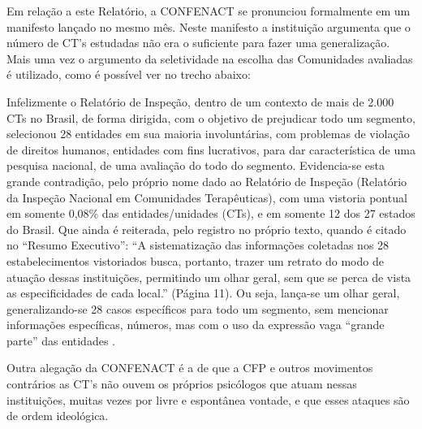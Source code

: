 \documentclass[
	12pt,				%
	oneside,			%
	a4paper,			%
	sumario=tradicional,
	english,			%
	brazil				%
	]{abntex2}
\begin{document}
Em relação a este Relatório, a CONFENACT se pronunciou formalmente em um manifesto lançado no mesmo mês. Neste manifesto a instituição argumenta que o número de CT's estudadas não era o suficiente para fazer uma generalização. Mais uma vez o argumento da seletividade na escolha das Comunidades avaliadas é utilizado, como é possível ver no trecho abaixo:
\begin{quoting}[rightmargin=0cm,leftmargin=4cm]
\begin{singlespace}
{\footnotesize
Infelizmente o Relatório de Inspeção, dentro de um contexto de mais de 2.000 CTs no Brasil, de forma dirigida, com o objetivo de prejudicar todo um segmento, selecionou 28 entidades em sua maioria involuntárias, com problemas de violação de direitos humanos, entidades com fins lucrativos, para dar característica de uma pesquisa nacional, de uma avaliação do todo do segmento. Evidencia-se esta grande contradição, pelo próprio nome dado ao Relatório de Inspeção (Relatório da Inspeção Nacional em Comunidades Terapêuticas), com uma vistoria pontual em somente 0,08\% das entidades/unidades (CTs), e em somente 12 dos 27 estados do Brasil. Que ainda é reiterada, pelo registro no próprio texto, quando é citado no “Resumo Executivo”: “A sistematização das informações coletadas nos 28 estabelecimentos vistoriados busca, portanto, trazer um retrato do modo de atuação dessas instituições, permitindo um olhar geral, sem que se perca de vista as especificidades de cada local.” (Página 11). Ou seja, lança-se um olhar geral, generalizando-se 28 casos específicos para todo um segmento, sem mencionar informações específicas, números, mas com o uso da expressão vaga “grande parte” das entidades \cite[p. 02]{confenact2018b}.}
\end{singlespace}
\end{quoting}
Outra alegação da CONFENACT é a de que a CFP e outros movimentos contrários as CT's não ouvem os próprios psicólogos que atuam nessas instituições, muitas vezes por livre e espontânea vontade, e que esses ataques são de ordem ideológica.
\end{document}
